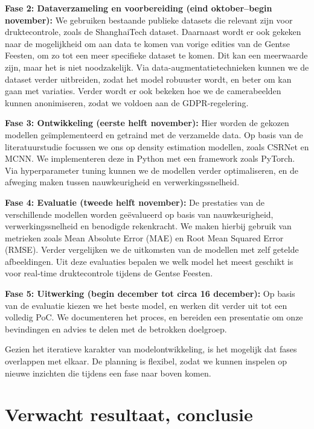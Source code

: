 \textbf{Fase 2: Dataverzameling en voorbereiding (eind oktober--begin november): } We gebruiken bestaande publieke datasets die relevant zijn voor druktecontrole, zoals de ShanghaiTech dataset. Daarnaast wordt er ook gekeken naar de mogelijkheid om aan data te komen van vorige edities van de Gentse Feesten, om zo tot een meer specifieke dataset te komen. Dit kan een meerwaarde zijn, maar het is niet noodzakelijk. Via data-aug\-men\-ta\-tie\-tech\-nie\-ken kunnen we de dataset verder uitbreiden, zodat het model robuuster wordt, en beter om kan gaan met variaties. Verder wordt er ook bekeken hoe we de camerabeelden kunnen anonimiseren, zodat we voldoen aan de GDPR-regelering.

\textbf{Fase 3: Ontwikkeling (eerste helft november): } Hier worden de gekozen modellen geïmplementeerd en getraind met de verzamelde data. Op basis van de literatuurstudie focussen we ons op density estimation modellen, zoals CSRNet en MCNN. We implementeren deze in Python met een framework zoals PyTorch. Via hyperparameter tuning kunnen we de modellen verder optimaliseren, en de afweging maken tussen nauwkeurigheid en verwerkingssnelheid.

\textbf{Fase 4: Evaluatie (tweede helft november): } De prestaties van de verschillende modellen worden geëvalueerd op basis van nauwkeurigheid, verwerkingssnelheid en benodigde rekenkracht. We maken hierbij gebruik van metrieken zoals Mean Absolute Error (MAE) en Root Mean Squared Error (RMSE). Verder vergelijken we de uitkomsten van de modellen met zelf getelde afbeeldingen. Uit deze evaluaties bepalen we welk model het meest geschikt is voor real-time druktecontrole tijdens de Gentse Feesten.

\textbf{Fase 5: Uitwerking (begin december tot circa 16 december): } Op basis van de evaluatie kiezen we het beste model, en werken dit verder uit tot een volledig PoC. We documenteren het proces, en bereiden een presentatie om onze bevindingen en advies te delen met de betrokken doelgroep.

Gezien het iteratieve karakter van modelontwikkeling, is het mogelijk dat fases overlappen met elkaar. De planning is flexibel, zodat we kunnen inspelen op nieuwe inzichten die tijdens een fase naar boven komen.

\section{Verwacht resultaat, conclusie}%
\label{sec:verwachte_resultaten}

